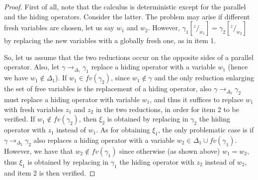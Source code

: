\documentclass[main.tex]{subfiles}
\begin{document}
\begin{proof}%
	First of all, note that the calculus is deterministic except for the parallel and the hiding operators.
	Consider the latter. The problem may arise if different fresh variables are chosen, let us say $w_1$ and $w_2$.
	However, $\gamma_1[^z/_{w_1}] =  \gamma_2[^z/_{w_2}]$ 
	by replacing the new variables with a globally fresh one, as in item 1.
	
	So, let us assume that the two reductions occur on the opposite sides of a parallel operator.
	Also, let $\gamma \rightarrow_{\Delta_1} \gamma_1$ replace a hiding operator with a variable $w_1$
	(hence we have $w_1 \not \in \Delta_1$). 
	If $w_1 \in fv(\gamma_2)$, since $w_1 \not \in \gamma$ and the only reduction enlarging the set of free variables is the 
	replacement of a hiding operator, also $\gamma \rightarrow_{\Delta_2} \gamma_2$ 
	must replace a hiding operator with variable $w_1$, and thus it suffices to replace $w_1$ 
	with fresh variables $z_1$ and $z_2$ in  the two reductions, in order for item 2 to be verified.
	If $w_1 \not \in fv(\gamma_2)$, then $\xi_2$ is obtained by replacing in $\gamma_2$ 
	the hiding operator with $z_1$ instead of $w_1$. As for obtaining $\xi_1$, the only problematic case is 
	if  $\gamma \rightarrow_{\Delta_2} \gamma_2$ also replaces 
	a hiding operator with a variable $w_2 \in \Delta_1 \cup fv(\gamma_1)$.
	However, we have that $w_2 \not \in fv(\gamma_1)$ since otherwise (as shown above) $w_1 = w_2$, 
	thus $\xi_1$ is obtained by replacing in $\gamma_1$ the hiding operator with $z_2$ instead of $w_2$,
	and item 2 is then verified. 
		

\end{proof}
\end{document}
